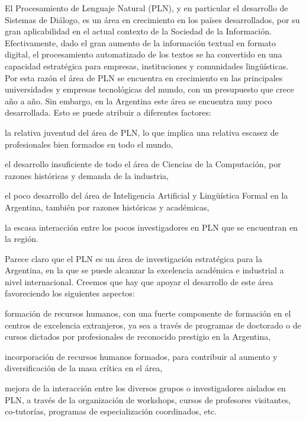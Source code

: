 
El Procesamiento de Lenguaje Natural (PLN), y en particular el
desarrollo de Sistemas de Di\'alogo, es un \'area en crecimiento
en los pa\'ises desarrollados, por su gran aplicabilidad en el
actual contexto de la Sociedad de la Informaci\'on. Efectivamente,
dado el gran aumento de la informaci\'on textual en formato
digital, el procesamiento automatizado de los textos se ha
convertido en una capacidad estrat\'egica para empresas,
instituciones y comunidades ling\"u\'isticas. Por esta raz\'on
el \'area de PLN se encuentra en crecimiento en las principales
universidades y empresas tecnol\'ogicas del mundo, con un
presupuesto que crece a\~no a a\~no. Sin embargo, en la Argentina
este \'area se encuentra muy poco desarrollada. Esto se puede
atribuir a diferentes factores:
\begin{myitemize}
\item la relativa juventud del \'area de PLN, lo que implica una relativa escasez de profesionales bien formados en todo el mundo,
\item el desarrollo insuficiente de todo el \'area de Ciencias de la Computaci\'on, por razones hist\'oricas y demanda de la industria,
\item el poco desarrollo del \'area de Inteligencia Artificial y
Ling\"u\'istica Formal en la Argentina, tambi\'en por razones hist\'oricas
y acad\'emicas,
\item la escasa interacci\'on entre los pocos investigadores en PLN que se encuentran en la regi\'on.
\end{myitemize}

Parece claro que el PLN es un \'area de investigaci\'on estrat\'egica
para la Argentina, en la que se puede alcanzar la excelencia acad\'emica
e industrial a nivel internacional. Creemos que hay que apoyar el
desarrollo de este \'area favoreciendo los siguientes aspectos:
\begin{myitemize}
\item formaci\'on de recursos humanos, con una fuerte componente de
formaci\'on en el centros de excelencia extranjeros, ya sea a trav\'es
de programas de doctorado o de cursos dictados por profesionales de
reconocido prestigio en la Argentina,
\item incorporaci\'on de recursos humanos formados, para contribuir
al aumento y diversificaci\'on de la masa cr\'itica en el \'area,
\item mejora de la interacci\'on entre los diversos grupos o investigadores aislados en PLN, a
trav\'es de la organizaci\'on de workshops, cursos de profesores visitantes, co-tutor\'ias,
programas de especializaci\'on coordinados, etc.
\end{myitemize}

